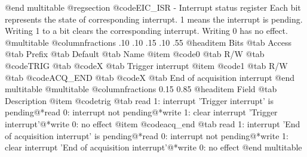 @end multitable
@regsection @code{EIC_ISR} - Interrupt status register
Each bit represents the state of corresponding interrupt. 1 means the interrupt is pending. Writing 1 to a bit clears the corresponding interrupt. Writing 0 has no effect.
@multitable @columnfractions .10 .10 .15 .10 .55
@headitem Bits @tab Access @tab Prefix @tab Default @tab Name
@item @code{0}
@tab R/W @tab
@code{TRIG}
@tab @code{X} @tab 
Trigger interrupt
@item @code{1}
@tab R/W @tab
@code{ACQ_END}
@tab @code{X} @tab 
End of acquisition interrupt
@end multitable
@multitable @columnfractions 0.15 0.85
@headitem Field @tab Description
@item @code{trig} @tab read 1: interrupt 'Trigger interrupt' is pending@*read 0: interrupt not pending@*write 1: clear interrupt 'Trigger interrupt'@*write 0: no effect
@item @code{acq_end} @tab read 1: interrupt 'End of acquisition interrupt' is pending@*read 0: interrupt not pending@*write 1: clear interrupt 'End of acquisition interrupt'@*write 0: no effect
@end multitable
